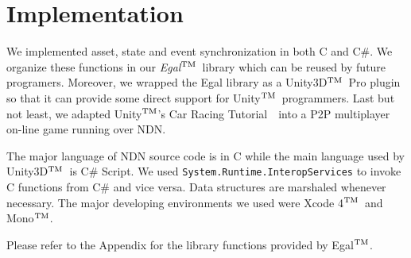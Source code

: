 \chapter{Implementation}
\label{implementation}

\label{implementation}
\def\tm{\leavevmode\hbox{$\rm {}^{TM}$}} %

We implemented asset, state and event synchronization in both C and C\#. We organize these functions in our \emph{Egal}\tm~library which can be reused by future programers. Moreover, we wrapped the Egal library as a Unity3D\tm~Pro plugin so that it can provide some direct support for Unity\tm~programmers. Last but not least, we adapted Unity\tm's Car Racing Tutorial~\cite{UnityCar}~into a P2P multiplayer on-line game running over NDN.

The major language of NDN source code is in C while the main language used by Unity3D\tm~is C\# Script. We used \verb|System.Runtime.InteropServices| to invoke C functions from C\# and vice versa. Data structures are marshaled whenever necessary. The major developing environments we used were Xcode 4\tm~and Mono\tm.

Please refer to the Appendix for the library functions provided by Egal\tm.
